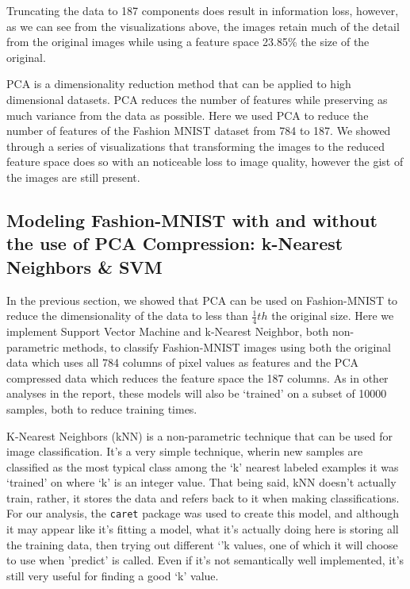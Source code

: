 \documentclass{article}
\begin{document}
Truncating the data to 187 components does result in information loss,
however, as we can see from the visualizations above, the images retain
much of the detail from the original images while using a feature space
23.85\% the size of the original.

PCA is a dimensionality reduction method that can be applied to high
dimensional datasets. PCA reduces the number of features while
preserving as much variance from the data as possible. Here we used PCA
to reduce the number of features of the Fashion MNIST dataset from 784
to 187. We showed through a series of visualizations that transforming
the images to the reduced feature space does so with an noticeable loss
to image quality, however the gist of the images are still present.

\hypertarget{modeling-fashion-mnist-with-and-without-the-use-of-pca-compression-k-nearest-neighbors-svm}{%
\subsection{Modeling Fashion-MNIST with and without the use of PCA
Compression: k-Nearest Neighbors \&
SVM}\label{modeling-fashion-mnist-with-and-without-the-use-of-pca-compression-k-nearest-neighbors-svm}}

In the previous section, we showed that PCA can be used on Fashion-MNIST
to reduce the dimensionality of the data to less than \(\frac{1}{4}th\)
the original size. Here we implement Support Vector Machine and
k-Nearest Neighbor, both non-parametric methods, to classify
Fashion-MNIST images using both the original data which uses all 784
columns of pixel values as features and the PCA compressed data which
reduces the feature space the 187 columns. As in other analyses in the
report, these models will also be `trained' on a subset of 10000
samples, both to reduce training times.

K-Nearest Neighbors (kNN) is a non-parametric technique that can be used
for image classification. It's a very simple technique, wherin new
samples are classified as the most typical class among the `k' nearest
labeled examples it was `trained' on where `k' is an integer value. That
being said, kNN doesn't actually train, rather, it stores the data and
refers back to it when making classifications. For our analysis, the
\texttt{caret} package was used to create this model, and although it
may appear like it's fitting a model, what it's actually doing here is
storing all the training data, then trying out different `'k values, one
of which it will choose to use when 'predict' is called. Even if it's
not semantically well implemented, it's still very useful for finding a
good `k' value.
\end{document}
